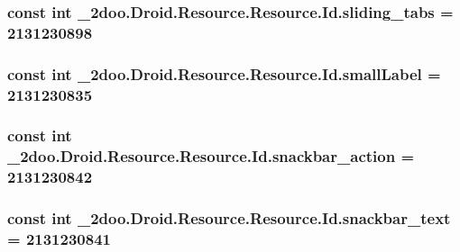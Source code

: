 \hypertarget{class__2doo_1_1_droid_1_1_resource_1_1_id_cb5e75c6193dfa0a93d0039b8cd3b3b9}{
\subsubsection[{sliding\_\-tabs}]{\setlength{\rightskip}{0pt plus 5cm}const int \_\-2doo.Droid.Resource.Resource.Id.sliding\_\-tabs = 2131230898}}
\label{class__2doo_1_1_droid_1_1_resource_1_1_id_cb5e75c6193dfa0a93d0039b8cd3b3b9}


\hypertarget{class__2doo_1_1_droid_1_1_resource_1_1_id_f762e5aca59a463131d2fcfe1fa492e0}{
\subsubsection[{smallLabel}]{\setlength{\rightskip}{0pt plus 5cm}const int \_\-2doo.Droid.Resource.Resource.Id.smallLabel = 2131230835}}
\label{class__2doo_1_1_droid_1_1_resource_1_1_id_f762e5aca59a463131d2fcfe1fa492e0}


\hypertarget{class__2doo_1_1_droid_1_1_resource_1_1_id_2eaf0dd064bd33847ff45e0755f07ed8}{
\subsubsection[{snackbar\_\-action}]{\setlength{\rightskip}{0pt plus 5cm}const int \_\-2doo.Droid.Resource.Resource.Id.snackbar\_\-action = 2131230842}}
\label{class__2doo_1_1_droid_1_1_resource_1_1_id_2eaf0dd064bd33847ff45e0755f07ed8}


\hypertarget{class__2doo_1_1_droid_1_1_resource_1_1_id_6b811559ea852a960b5c610816d2213f}{
\subsubsection[{snackbar\_\-text}]{\setlength{\rightskip}{0pt plus 5cm}const int \_\-2doo.Droid.Resource.Resource.Id.snackbar\_\-text = 2131230841}}
\label{class__2doo_1_1_droid_1_1_resource_1_1_id_6b811559ea852a960b5c610816d2213f}


